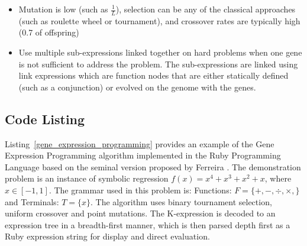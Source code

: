 \begin{itemize}
	\item Mutation is low (such as $\frac{1}{L}$), selection can be any of the classical approaches (such as roulette wheel or tournament), and crossover rates are typically high (0.7 of offspring)
	\item Use multiple sub-expressions linked together on hard problems when one gene is not sufficient to address the problem. The sub-expressions are linked using link expressions which are function nodes that are either statically defined (such as a conjunction) or evolved on the genome with the genes.
\end{itemize}

\subsection{Code Listing}
Listing~\ref{gene_expression_programming} provides an example of the Gene Expression Programming algorithm implemented in the Ruby Programming Language based on the seminal version proposed by Ferreira \cite{Ferreira2001}.
The demonstration problem is an instance of symbolic regression $f(x)=x^4+x^3+x^2+x$, where $x\in[-1,1]$. The grammar used in this problem is: Functions: $F=\{+,-,\div,\times,\}$ and Terminals: $T=\{x\}$.
The algorithm uses binary tournament selection, uniform crossover and point mutations. The K-expression is decoded to an expression tree in a breadth-first manner, which is then parsed depth first as a Ruby expression string for display and direct evaluation.




